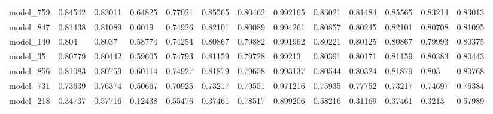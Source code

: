 \begin{tabular}{lllllllllllll}
model\_759 & 0.84542 & 0.83011 & 0.64825  & 0.77021 & 0.85565     & 0.80462     & 0.992165 & 0.83021  & 0.81484   & 0.85565 & 0.83214 & 0.83013 \\
model\_847 & 0.81438 & 0.81089 & 0.6019   & 0.74926 & 0.82101     & 0.80089     & 0.994261 & 0.80857  & 0.80245   & 0.82101 & 0.80708 & 0.81095 \\
model\_140 & 0.804   & 0.8037  & 0.58774  & 0.74254 & 0.80867     & 0.79882     & 0.991962 & 0.80221  & 0.80125   & 0.80867 & 0.79993 & 0.80375 \\
model\_35  & 0.80779 & 0.80442 & 0.59605  & 0.74793 & 0.81159     & 0.79728     & 0.99213  & 0.80391  & 0.80171   & 0.81159 & 0.80383 & 0.80443 \\
model\_856 & 0.81083 & 0.80759 & 0.60114  & 0.74927 & 0.81879     & 0.79658     & 0.993137 & 0.80544  & 0.80324   & 0.81879 & 0.803   & 0.80768 \\
model\_731 & 0.73639 & 0.76374 & 0.50667  & 0.70925 & 0.73217     & 0.79551     & 0.971216 & 0.75935  & 0.77752   & 0.73217 & 0.74697 & 0.76384 \\
model\_218 & 0.34737 & 0.57716 & 0.12438  & 0.55476 & 0.37461     & 0.78517     & 0.899206 & 0.58216  & 0.31169   & 0.37461 & 0.3213  & 0.57989
\end{tabular}